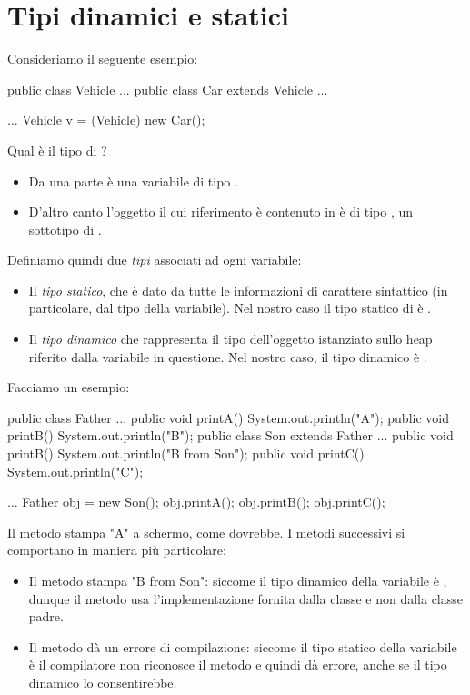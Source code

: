 \section{Tipi dinamici e statici}

Consideriamo il seguente esempio:
\begin{Java}
    public class Vehicle {...}
    public class Car extends Vehicle {...}

    ...
    Vehicle v = (Vehicle) new Car();
\end{Java}

Qual è il tipo di ? \begin{itemize}
    \item Da una parte  è una variabile di tipo .
    \item D'altro canto l'oggetto il cui riferimento è contenuto in  è di tipo , un sottotipo di .
\end{itemize}

Definiamo quindi due \emph{tipi} associati ad ogni variabile: \begin{itemize}
    \item Il \emph{tipo statico}, che è dato da tutte le informazioni di carattere sintattico (in particolare, dal tipo della variabile). Nel nostro caso il tipo statico di  è .
    \item Il \emph{tipo dinamico} che rappresenta il tipo dell'oggetto istanziato sullo heap riferito dalla variabile in questione. Nel nostro caso, il tipo dinamico è .
\end{itemize}

Facciamo un esempio:
\begin{Java}
    public class Father {
        ...
        public void printA(){
            System.out.println("A");
        }
        public void printB(){
            System.out.println("B");
        }
    }
    public class Son extends Father {
        ...
        public void printB(){
            System.out.println("B from Son");
        }
        public void printC(){
            System.out.println("C");
        }
    }

    ...
    Father obj = new Son();
    obj.printA();
    obj.printB();
    obj.printC();
\end{Java}

Il metodo  stampa "A" a schermo, come dovrebbe. I metodi successivi si comportano in maniera più particolare:
\begin{itemize}
    \item Il metodo  stampa "B from Son": siccome il tipo dinamico della variabile  è , dunque il metodo  usa l'implementazione fornita dalla classe  e non dalla classe padre.
    \item Il metodo  dà un errore di compilazione: siccome il tipo statico della variabile  è  il compilatore non riconosce il metodo  e quindi dà errore, anche se il tipo dinamico lo consentirebbe.
\end{itemize}

